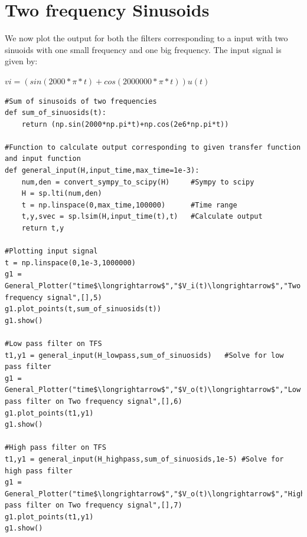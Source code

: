 \documentclass[11pt, a4paper]{article}
\begin{document}
\section{Two frequency Sinusoids}
We now plot the output for both the filters corresponding to a input with two sinuoids with one small frequency and one big frequency. The input signal is given by:\\
\begin{center}
$vi = (sin(2000*\pi*t) + cos(2000000*\pi*t))u(t)$
\end{center}

\begin{lstlisting}
#Sum of sinusoids of two frequencies
def sum_of_sinuosids(t):
	return (np.sin(2000*np.pi*t)+np.cos(2e6*np.pi*t))

#Function to calculate output corresponding to given transfer function and input function
def general_input(H,input_time,max_time=1e-3):
	num,den = convert_sympy_to_scipy(H)		#Sympy to scipy
	H = sp.lti(num,den)
	t = np.linspace(0,max_time,100000)		#Time range
	t,y,svec = sp.lsim(H,input_time(t),t)	#Calculate output
	return t,y

#Plotting input signal
t = np.linspace(0,1e-3,1000000)
g1 = General_Plotter("time$\longrightarrow$","$V_i(t)\longrightarrow$","Two frequency signal",[],5)
g1.plot_points(t,sum_of_sinuosids(t))
g1.show()

#Low pass filter on TFS
t1,y1 = general_input(H_lowpass,sum_of_sinuosids)	#Solve for low pass filter
g1 = General_Plotter("time$\longrightarrow$","$V_o(t)\longrightarrow$","Low pass filter on Two frequency signal",[],6)
g1.plot_points(t1,y1)
g1.show()

#High pass filter on TFS
t1,y1 = general_input(H_highpass,sum_of_sinuosids,1e-5)	#Solve for high pass filter
g1 = General_Plotter("time$\longrightarrow$","$V_o(t)\longrightarrow$","High pass filter on Two frequency signal",[],7)
g1.plot_points(t1,y1)
g1.show()
\end{lstlisting}
\end{document}
